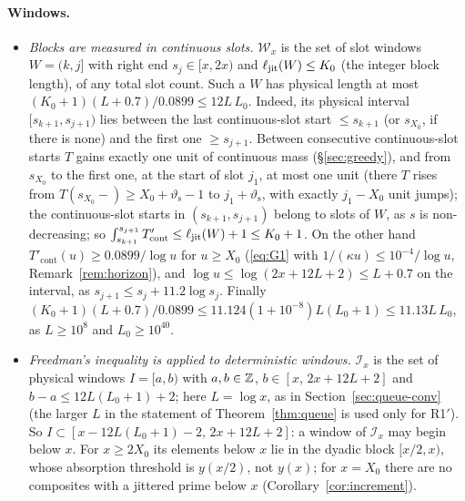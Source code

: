 \paragraph{Windows.}
\begin{itemize}
\item \emph{Blocks are measured in continuous slots.} $\mathcal W_x$ is the set of slot windows $W=(k,j]$ with right end
  $s_j\in[x,2x)$ and $\ell_{\mathrm{jit}}(W)\le K_0$ (the integer block length), of any total slot count. Such a $W$ has physical length at
  most $(K_0+1)(L+0.7)/0.0899\le12L\,L_0$. Indeed, its physical interval $[s_{k+1},s_{j+1})$ lies between the last continuous-slot
  start $\le s_{k+1}$ (or $s_{X_0}$, if there is none) and the first one $\ge s_{j+1}$. Between consecutive continuous-slot starts
  $T$ gains exactly one unit of continuous mass (\S\ref{sec:greedy}), and from $s_{X_0}$ to the first one, at the start of slot
  $j_1$, at most one unit (there $T$ rises from $T(s_{X_0}-)\ge X_0+\vartheta_{\mathrm s}-1$ to $j_1+\vartheta_{\mathrm s}$, with
  exactly $j_1-X_0$ unit jumps); the continuous-slot starts in $(s_{k+1},s_{j+1})$ belong to slots of $W$, as $s$ is
  non-decreasing; so $\int_{s_{k+1}}^{s_{j+1}}T'_{\mathrm{cont}}\le\ell_{\mathrm{jit}}(W)+1\le K_0+1$. On the other hand
  $T'_{\mathrm{cont}}(u)\ge0.0899/\log u$ for $u\ge X_0$ (\eqref{eq:G1} with $1/(\kappa u)\le10^{-4}/\log u$, Remark~\ref{rem:horizon}),
  and $\log u\le\log(2x+12L+2)\le L+0.7$ on the interval, as $s_{j+1}\le s_j+11.2\log s_j$. Finally
  $(K_0+1)(L+0.7)/0.0899\le11.124(1+10^{-8})L(L_0+1)\le11.13L\,L_0$, as $L\ge10^8$ and $L_0\ge10^{40}$.
\item \emph{Freedman's inequality is applied to deterministic windows.} $\mathcal I_x$ is the set of physical windows
  $I=[a,b)$ with $a,b\in\mathbb{Z}$, $b\in[x,\,2x+12L+2]$ and $b-a\le12L(L_0+1)+2$; here $L=\log x$, as in
  Section~\ref{sec:queue-conv} (the larger $L$ in the statement of Theorem~\ref{thm:queue} is used only for R1$'$). So
  $I\subset[x-12L(L_0+1)-2,\,2x+12L+2]$: a window of $\mathcal I_x$ may begin below $x$. For $x\ge2X_0$ its elements below $x$
  lie in the dyadic block $[x/2,x)$, whose absorption threshold is $y(x/2)$, not $y(x)$; for $x=X_0$ there are no composites
  with a jittered prime below $x$ (Corollary~\ref{cor:increment}).
\end{itemize}
